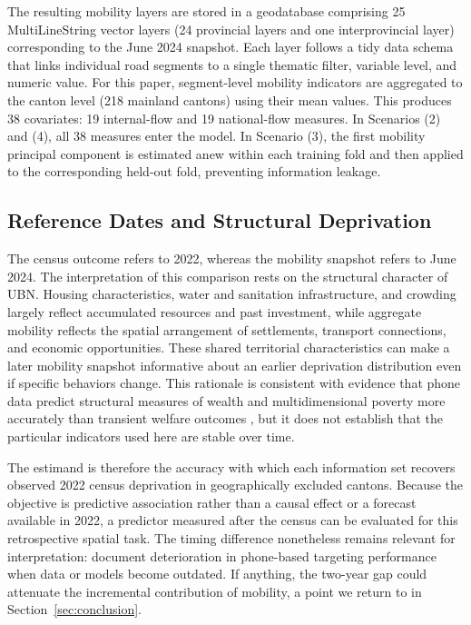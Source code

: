 \documentclass[pdflatex,sn-apa]{sn-jnl}
\begin{document}
The resulting mobility layers are stored in a geodatabase comprising 25 MultiLineString vector layers (24 provincial layers and one interprovincial layer) corresponding to the June 2024 snapshot. Each layer follows a tidy data schema that links individual road segments to a single thematic filter, variable level, and numeric value. For this paper, segment-level mobility indicators are aggregated to the canton level (218 mainland cantons) using their mean values. This produces 38 covariates: 19 internal-flow and 19 national-flow measures. In Scenarios (2) and (4), all 38 measures enter the model. In Scenario (3), the first mobility principal component is estimated anew within each training fold and then applied to the corresponding held-out fold, preventing information leakage.

\subsection{Reference Dates and Structural Deprivation}
\label{subsec:reference_dates}

The census outcome refers to 2022, whereas the mobility snapshot refers to June 2024. The interpretation of this comparison rests on the structural character of UBN. Housing characteristics, water and sanitation infrastructure, and crowding largely reflect accumulated resources and past investment, while aggregate mobility reflects the spatial arrangement of settlements, transport connections, and economic opportunities. These shared territorial characteristics can make a later mobility snapshot informative about an earlier deprivation distribution even if specific behaviors change. This rationale is consistent with evidence that phone data predict structural measures of wealth and multidimensional poverty more accurately than transient welfare outcomes \citep{Smith2026Wellbeing}, but it does not establish that the particular indicators used here are stable over time.

The estimand is therefore the accuracy with which each information set recovers observed 2022 census deprivation in geographically excluded cantons. Because the objective is predictive association rather than a causal effect or a forecast available in 2022, a predictor measured after the census can be evaluated for this retrospective spatial task. The timing difference nonetheless remains relevant for interpretation: \citet{aiken2022machine} document deterioration in phone-based targeting performance when data or models become outdated. If anything, the two-year gap could attenuate the incremental contribution of mobility, a point we return to in Section~\ref{sec:conclusion}.
\end{document}
